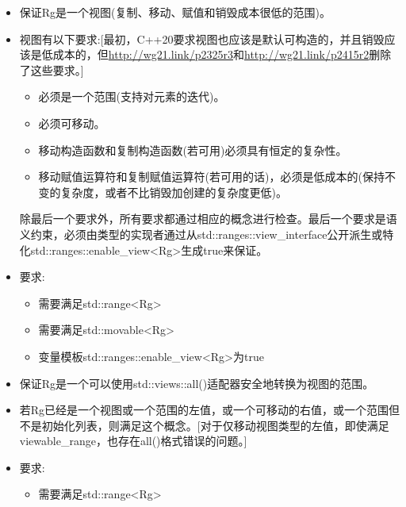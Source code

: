\begin{itemize}
\item
保证Rg是一个视图(复制、移动、赋值和销毁成本很低的范围)。

\item
视图有以下要求:[最初，C++20要求视图也应该是默认可构造的，并且销毁应该是低成本的，但\url{http://wg21.link/p2325r3}和\url{http://wg21.link/p2415r2}删除了这些要求。]

\begin{itemize}
\item
必须是一个范围(支持对元素的迭代)。

\item
必须可移动。

\item
移动构造函数和复制构造函数(若可用)必须具有恒定的复杂性。

\item
移动赋值运算符和复制赋值运算符(若可用的话)，必须是低成本的(保持不变的复杂度，或者不比销毁加创建的复杂度更低)。
\end{itemize}

除最后一个要求外，所有要求都通过相应的概念进行检查。最后一个要求是语义约束，必须由类型的实现者通过从std::ranges::view\_interface公开派生或特化std::ranges::enable\_view<Rg>生成true来保证。

\item
要求:

\begin{itemize}
\item
需要满足std::range<Rg>

\item
需要满足std::movable<Rg>

\item
变量模板std::ranges::enable\_view<Rg>为true
\end{itemize}
\end{itemize}


\begin{itemize}
\item
保证Rg是一个可以使用std::views::all()适配器安全地转换为视图的范围。

\item
若Rg已经是一个视图或一个范围的左值，或一个可移动的右值，或一个范围但不是初始化列表，则满足这个概念。[对于仅移动视图类型的左值，即使满足viewable\_range，也存在all()格式错误的问题。]

\item
要求:

\begin{itemize}
\item
需要满足std::range<Rg>

\end{itemize}
\end{itemize}

